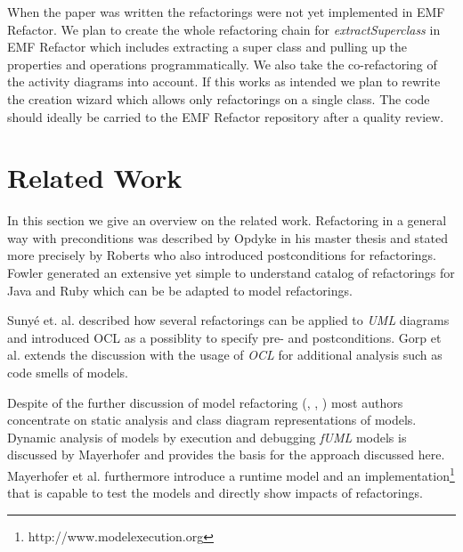 \documentclass{llncs}
\begin{document}
When the paper was written the refactorings were not yet implemented in EMF Refactor.
We plan to create the whole refactoring chain for \textit{extractSuperclass} in EMF Refactor which includes extracting 
a super class and pulling up the properties and operations programmatically. We also take the co-refactoring of the activity 
diagrams into account. If this works as intended we plan to rewrite the creation wizard which allows only refactorings 
on a single class. The code should ideally be carried to the EMF Refactor repository after a quality review.

\section{Related Work}
\label{sec:relatedwork}

In this section we give an overview on the related work. Refactoring in a general way with preconditions was described
by Opdyke \cite{mast:REFOOF} in his master thesis and stated more precisely by Roberts \cite{rob99} who also introduced
postconditions for refactorings. Fowler \cite{fow99} generated an extensive yet simple to understand catalog of
refactorings for Java and Ruby which can be be adapted to model refactorings.


Suny{\'e} et. al. \cite{DBLP:conf/uml/SunyePTJ01} described how several refactorings can be applied to \textit{UML}
diagrams and introduced OCL as a possiblity to specify pre- and postconditions. Gorp et al. \cite{gorp03} extends the
discussion with the usage of \textit{OCL} for additional analysis such as code smells of models.


Despite of the further discussion of model refactoring (\cite{DBLP:conf/uml/CorreaW04}, \cite{DBLP:conf/ershov/BaarM06},
\cite{DBLP:journals/ase/ArendtT13}) most authors concentrate on static analysis and class diagram representations of
models. Dynamic analysis of models by execution and debugging \textit{fUML} models is discussed by Mayerhofer
\cite{DBLP:conf/icse/Mayerhofer12} and provides the basis for the approach discussed here. Mayerhofer et al.
\cite{DBLP:conf/models/MayerhoferLK12} furthermore introduce a runtime model and an
implementation\footnote{http://www.modelexecution.org} that is capable to test the models and directly show impacts of
refactorings.

\end{document}
